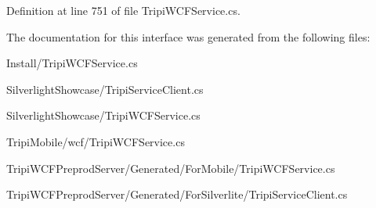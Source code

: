 Definition at line 751 of file TripiWCFService.cs.

The documentation for this interface was generated from the following files:\begin{DoxyCompactItemize}
\item 
Install/TripiWCFService.cs\item 
SilverlightShowcase/TripiServiceClient.cs\item 
SilverlightShowcase/TripiWCFService.cs\item 
TripiMobile/wcf/TripiWCFService.cs\item 
TripiWCFPreprodServer/Generated/ForMobile/TripiWCFService.cs\item 
TripiWCFPreprodServer/Generated/ForSilverlite/TripiServiceClient.cs\end{DoxyCompactItemize}
